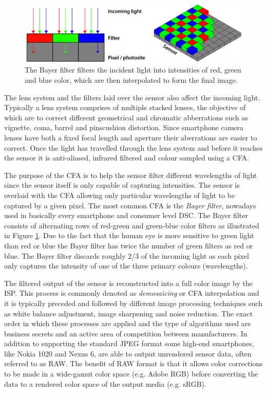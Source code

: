 \documentclass[thesis.tex]{subfiles}
\begin{document}
\begin{figure}[ht]
\centering \includegraphics[width=\textwidth]{images/bayer}
\caption{The Bayer filter filters the incident light into intensities of red, green and blue color, which are then interpolated to form the final image. \label{figure:bayer}}
\end{figure}

The lens system and the filters laid over the sensor also affect the incoming light. Typically a lens system comprises of multiple stacked lenses, the objective of which are to correct different geometrical and chromatic abberrations such as vignette, coma, barrel and pinscushion distortion. Since smartphone camera lenses have both a fixed focal length and aperture their aberrations are easier to correct. Once the light has travelled through the lens system and before it reaches the sensor it is anti-aliased, infrared filtered and colour sampled using a CFA. \cite{color_pipeline}

The purpose of the CFA is to help the sensor filter different wavelengths of light since the sensor itself is only capable of capturing intensities. The sensor is overlaid with the CFA allowing only particular wavelengths of light to be captured by a given pixel. The most common CFA is the \textit{Bayer filter}, nowadays used in basically every smartphone and consumer level DSC. The Bayer filter consists of alternating rows of red-green and green-blue color filters as illustrated in Figure \ref{figure:bayer}. Due to the fact that the human eye is more sensitive to green light than red or blue the Bayer filter has twice the number of green filters as red or blue. The Bayer filter discards roughly 2/3 of the incoming light as each pixel only captures the intensity of one of the three primary colours (wavelengths).

The filtered output of the sensor is reconstructed into a full color image by the ISP. This process is commonly denoted as \textit{demosaicing} or CFA interpolation and it is typically preceded and followed by different image processing techniques such as white balance adjustment, image sharpening and noise reduction. The exact order in which these processes are applied and the type of algorithms used are business secrets and an active area of competition between manufacturers. In addition to supporting the standard JPEG format some high-end smartphones, like Nokia 1020 and Nexus 6, are able to output unrendered sensor data, often referred to as RAW. The benefit of RAW format is that it allows color corrections to be made in a wide-gamut color space (e.g. Adobe RGB) before converting the data to a rendered color space of the output media (e.g. sRGB).
\end{document}
